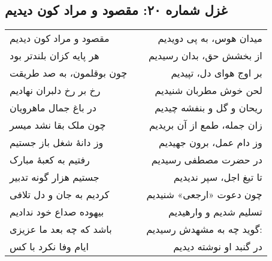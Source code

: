\begin{center}
\section*{غزل شماره ۲۰: مقصود و مراد کون دیدیم}
\label{sec:020}
\begin{longtable}{l p{0.5cm} r}
مقصود و مراد کون دیدیم
&&
میدان هوس، به پی دویدیم
\\
هر پایه کزان بلندتر بود
&&
از بخشش حق، بدان رسیدیم
\\
چون بوقلمون، به صد طریقت
&&
بر اوج هوای دل، تپیدیم
\\
رخ بر رخ دلبران نهادیم
&&
لحن خوش مطربان شنیدیم
\\
در باغ جمال ماهرویان
&&
ریحان و گل و بنفشه چیدیم
\\
چون ملک بقا نشد میسر
&&
زان جمله، طمع از آن بریدیم
\\
وز دانهٔ شغل باز جستیم
&&
وز دام عمل، برون جهیدیم
\\
رفتیم به کعبهٔ مبارک
&&
در حضرت مصطفی رسیدیم
\\
جستیم هزار گونه تدبیر
&&
تا تیغ اجل، سپر ندیدیم
\\
کردیم به جان و دل تلافی
&&
چون دعوت «ارجعی» شنیدیم
\\
بیهوده صداع خود ندادیم
&&
تسلیم شدیم و وارهیدیم
\\
باشد که چه بعد ما عزیزی
&&
گوید چه به مشهدش رسیدیم:
\\
ایام وفا نکرد با کس
&&
در گنبد او نوشته دیدیم
\\
\end{longtable}
\end{center}
